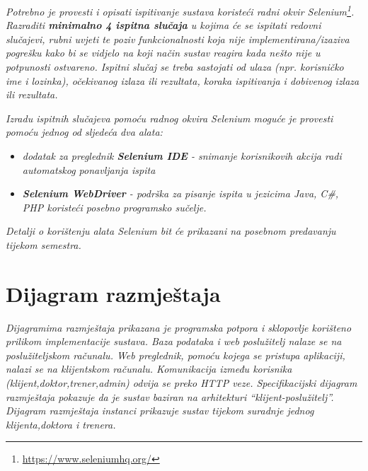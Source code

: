 			 \textit{Potrebno je provesti i opisati ispitivanje sustava koristeći radni okvir Selenium\footnote{\url{https://www.seleniumhq.org/}}. Razraditi \textbf{minimalno 4 ispitna slučaja} u kojima će se ispitati redovni slučajevi, rubni uvjeti te poziv funkcionalnosti koja nije implementirana/izaziva pogrešku kako bi se vidjelo na koji način sustav reagira kada nešto nije u potpunosti ostvareno. Ispitni slučaj se treba sastojati od ulaza (npr. korisničko ime i lozinka), očekivanog izlaza ili rezultata, koraka ispitivanja i dobivenog izlaza ili rezultata.\\ }
			 
			 \textit{Izradu ispitnih slučajeva pomoću radnog okvira Selenium moguće je provesti pomoću jednog od sljedeća dva alata:}
			 \begin{itemize}
			 	\item \textit{dodatak za preglednik \textbf{Selenium IDE} - snimanje korisnikovih akcija radi automatskog ponavljanja ispita	}
			 	\item \textit{\textbf{Selenium WebDriver} - podrška za pisanje ispita u jezicima Java, C\#, PHP koristeći posebno programsko sučelje.}
			 \end{itemize}
		 	\textit{Detalji o korištenju alata Selenium bit će prikazani na posebnom predavanju tijekom semestra.}
			
			\eject 
		
		
		\section{Dijagram razmještaja}
			
			\textit{Dijagramima razmještaja prikazana je programska potpora i sklopovlje korišteno prilikom implementacije sustava. Baza podataka i web poslužitelj nalaze se na poslužiteljskom računalu. Web preglednik, pomoću kojega se pristupa aplikaciji, nalazi se na klijentskom računalu. Komunikacija između korisnika (klijent,doktor,trener,admin) odvija se preko HTTP veze. Specifikacijski dijagram razmještaja pokazuje da je sustav baziran na arhitekturi “klijent-poslužitelj”. Dijagram razmještaja instanci prikazuje sustav tijekom suradnje jednog klijenta,doktora i trenera. }
			
